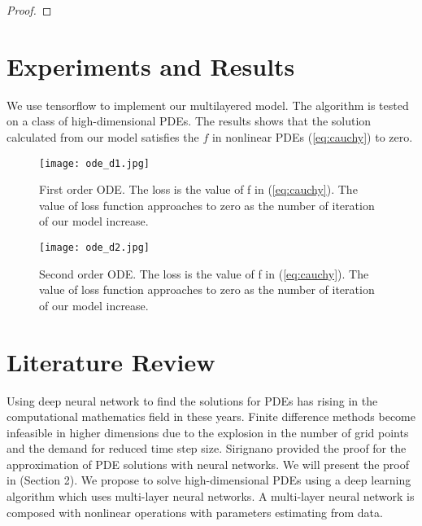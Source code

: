 \documentclass{article}
\begin{document}
\begin{proof}
\end{proof}

\section{Experiments and Results}

We use tensorflow to implement our multilayered model. The algorithm is tested on a class of high-dimensional PDEs. The results shows that the solution calculated from our model satisfies the $f$ in nonlinear PDEs (\ref{eq:cauchy}) to zero. 

\begin{figure}
	\texttt{[image: ode\_d1.jpg]}
	\caption{First order ODE. The loss is the value of f in (\ref{eq:cauchy}). The value of loss function approaches to zero as the number of iteration of our model increase.}
	\label{fig:ode_d1}
\end{figure}

\begin{figure}
	\texttt{[image: ode\_d2.jpg]}
	\caption{Second order ODE. The loss is the value of f in (\ref{eq:cauchy}). The value of loss function approaches to zero as the number of iteration of our model increase.}
	\label{fig:ode_d2}
\end{figure}


\section{Literature Review}

Using deep neural network to find the solutions for PDEs has rising in the computational mathematics field in these years.  Finite difference methods become infeasible in higher dimensions due to the explosion in the number of grid points and the demand for reduced time step size. Sirignano \cite{sirignano} provided the proof for the approximation of PDE solutions with neural networks. We will present the proof in (Section 2). We propose to solve high-dimensional PDEs using a deep learning algorithm which uses multi-layer neural networks. A multi-layer neural network is composed with nonlinear operations with parameters estimating from data.




\end{document}
